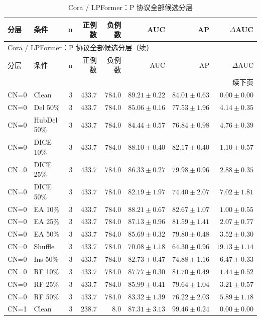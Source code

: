 {\footnotesize
\setlength{\tabcolsep}{3.2pt}
\renewcommand{\arraystretch}{1.10}
\begin{longtable}{llrrrrrr}
\caption{Cora / LPFormer：P 协议全部候选分层}\\
\toprule
分层 & 条件 & n & 正例数 & 负例数 & AUC & AP & $\Delta$AUC \\
\midrule
\endfirsthead
\multicolumn{8}{l}{Cora / LPFormer：P 协议全部候选分层（续）}\\
\toprule
分层 & 条件 & n & 正例数 & 负例数 & AUC & AP & $\Delta$AUC \\
\midrule
\endhead
\midrule\multicolumn{8}{r}{续下页}\\
\endfoot
\bottomrule
\endlastfoot
CN=0 & Clean & 3 & 433.7 & 784.0 & $89.21\pm0.22$ & $84.01\pm0.63$ & $0.00\pm0.00$ \\
CN=0 & Del 50\% & 3 & 433.7 & 784.0 & $85.06\pm0.16$ & $77.53\pm1.96$ & $4.14\pm0.35$ \\
CN=0 & HubDel 50\% & 3 & 433.7 & 784.0 & $84.44\pm0.57$ & $76.84\pm0.98$ & $4.76\pm0.39$ \\
CN=0 & DICE 10\% & 3 & 433.7 & 784.0 & $88.10\pm0.40$ & $82.17\pm0.40$ & $1.10\pm0.57$ \\
CN=0 & DICE 25\% & 3 & 433.7 & 784.0 & $86.33\pm0.27$ & $79.98\pm0.96$ & $2.88\pm0.35$ \\
CN=0 & DICE 50\% & 3 & 433.7 & 784.0 & $82.19\pm1.97$ & $74.40\pm2.07$ & $7.02\pm1.81$ \\
CN=0 & EA 10\% & 3 & 433.7 & 784.0 & $88.21\pm0.67$ & $82.67\pm1.07$ & $1.00\pm0.55$ \\
CN=0 & EA 25\% & 3 & 433.7 & 784.0 & $87.13\pm0.96$ & $81.59\pm1.41$ & $2.07\pm0.77$ \\
CN=0 & EA 50\% & 3 & 433.7 & 784.0 & $85.69\pm0.32$ & $79.80\pm0.48$ & $3.52\pm0.30$ \\
CN=0 & Shuffle & 3 & 433.7 & 784.0 & $70.08\pm1.18$ & $64.30\pm0.96$ & $19.13\pm1.14$ \\
CN=0 & Ins 50\% & 3 & 433.7 & 784.0 & $82.73\pm0.47$ & $74.88\pm1.16$ & $6.47\pm0.33$ \\
CN=0 & RF 10\% & 3 & 433.7 & 784.0 & $87.77\pm0.30$ & $81.70\pm0.49$ & $1.44\pm0.52$ \\
CN=0 & RF 25\% & 3 & 433.7 & 784.0 & $85.99\pm0.41$ & $79.64\pm1.04$ & $3.21\pm0.57$ \\
CN=0 & RF 50\% & 3 & 433.7 & 784.0 & $83.32\pm1.39$ & $76.22\pm2.03$ & $5.89\pm1.18$ \\
CN=1 & Clean & 3 & 238.7 & 8.0 & $87.31\pm3.13$ & $99.46\pm0.24$ & $0.00\pm0.00$ \\

\end{longtable}}
